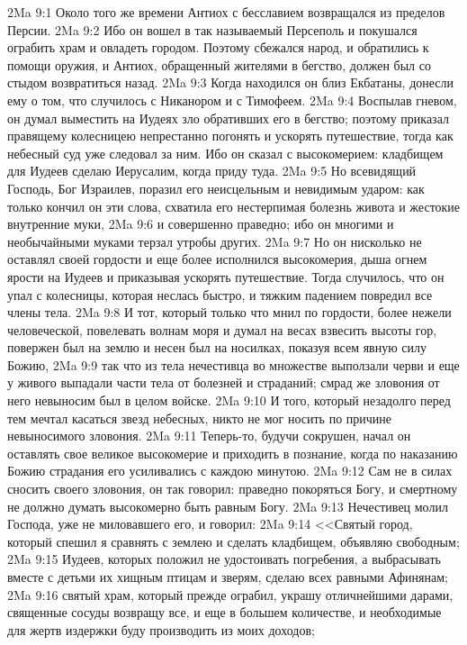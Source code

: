 \vs 2Ma 9:1 Около того же времени Антиох с бесславием возвращался из пределов Персии.
\vs 2Ma 9:2 Ибо он вошел в так называемый Персеполь и покушался ограбить храм и овладеть городом. Поэтому сбежался народ, и обратились к помощи оружия, и Антиох, обращенный жителями в бегство, должен был со стыдом возвратиться назад.
\vs 2Ma 9:3 Когда находился он близ Екбатаны, донесли ему о том, что случилось с Никанором и с Тимофеем.
\vs 2Ma 9:4 Воспылав гневом, он думал выместить на Иудеях зло обративших его в бегство; поэтому приказал правящему колесницею непрестанно погонять и ускорять путешествие, тогда как небесный суд уже следовал за ним. Ибо он сказал с высокомерием: кладбищем для Иудеев сделаю Иерусалим, когда приду туда.
\vs 2Ma 9:5 Но всевидящий Господь, Бог Израилев, поразил его неисцельным и невидимым ударом: как только кончил он эти слова, схватила его нестерпимая болезнь живота и жестокие внутренние муки,
\vs 2Ma 9:6 и совершенно праведно; ибо он многими и необычайными муками терзал утробы других.
\vs 2Ma 9:7 Но он нисколько не оставлял своей гордости и еще более исполнился высокомерия, дыша огнем ярости на Иудеев и приказывая ускорять путешествие. Тогда случилось, что он упал с колесницы, которая неслась быстро, и тяжким падением повредил все члены тела.
\vs 2Ma 9:8 И тот, который только что мнил по гордости, более нежели человеческой, повелевать волнам моря и думал на весах взвесить высоты гор, повержен был на землю и несен был на носилках, показуя всем явную силу Божию,
\vs 2Ma 9:9 так что из тела нечестивца во множестве выползали черви и еще у живого выпадали части тела от болезней и страданий; смрад же зловония от него невыносим был в целом войске.
\vs 2Ma 9:10 И того, который незадолго перед тем мечтал касаться звезд небесных, никто не мог носить по причине невыносимого зловония.
\vs 2Ma 9:11 Теперь-то, будучи сокрушен, начал он оставлять свое великое высокомерие и приходить в познание, когда по наказанию Божию страдания его усиливались с каждою минутою.
\vs 2Ma 9:12 Сам не в силах сносить своего зловония, он так говорил: праведно покоряться Богу, и смертному не должно думать высокомерно быть равным Богу.
\vs 2Ma 9:13 Нечестивец молил Господа, уже не миловавшего его, и говорил:
\vs 2Ma 9:14 <<Святый город, который спешил я сравнять с землею и сделать кладбищем, объявляю свободным;
\vs 2Ma 9:15 Иудеев, которых положил не удостоивать погребения, а выбрасывать вместе с детьми их хищным птицам и зверям, сделаю всех равными Афинянам;
\vs 2Ma 9:16 святый храм, который прежде ограбил, украшу отличнейшими дарами, священные сосуды возвращу все, и еще в большем количестве, и необходимые для жертв издержки буду производить из моих доходов;
